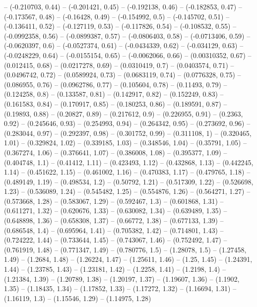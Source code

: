 -- (-0.210703, 0.44)
-- (-0.201421, 0.45)
-- (-0.192138, 0.46)
-- (-0.182853, 0.47)
-- (-0.173567, 0.48)
-- (-0.16428, 0.49)
-- (-0.154992, 0.5)
-- (-0.145702, 0.51)
-- (-0.136411, 0.52)
-- (-0.127119, 0.53)
-- (-0.117826, 0.54)
-- (-0.108532, 0.55)
-- (-0.0992358, 0.56)
-- (-0.0899387, 0.57)
-- (-0.0806403, 0.58)
-- (-0.0713406, 0.59)
-- (-0.0620397, 0.6)
-- (-0.0527374, 0.61)
-- (-0.0434339, 0.62)
-- (-0.034129, 0.63)
-- (-0.0248229, 0.64)
-- (-0.0155154, 0.65)
-- (-0.0062066, 0.66)
-- (0.00310352, 0.67)
-- (0.012415, 0.68)
-- (0.0217278, 0.69)
-- (0.0310419, 0.7)
-- (0.0403574, 0.71)
-- (0.0496742, 0.72)
-- (0.0589924, 0.73)
-- (0.0683119, 0.74)
-- (0.0776328, 0.75)
-- (0.086955, 0.76)
-- (0.0962786, 0.77)
-- (0.105604, 0.78)
-- (0.11493, 0.79)
-- (0.124258, 0.8)
-- (0.133587, 0.81)
-- (0.142917, 0.82)
-- (0.152249, 0.83)
-- (0.161583, 0.84)
-- (0.170917, 0.85)
-- (0.180253, 0.86)
-- (0.189591, 0.87)
-- (0.19893, 0.88)
-- (0.20827, 0.89)
-- (0.217612, 0.9)
-- (0.226955, 0.91)
-- (0.2363, 0.92)
-- (0.245646, 0.93)
-- (0.254993, 0.94)
-- (0.264342, 0.95)
-- (0.273692, 0.96)
-- (0.283044, 0.97)
-- (0.292397, 0.98)
-- (0.301752, 0.99)
-- (0.311108, 1)
-- (0.320465, 1.01)
-- (0.329824, 1.02)
-- (0.339185, 1.03)
-- (0.348546, 1.04)
-- (0.35791, 1.05)
-- (0.367274, 1.06)
-- (0.376641, 1.07)
-- (0.386008, 1.08)
-- (0.395377, 1.09)
-- (0.404748, 1.1)
-- (0.41412, 1.11)
-- (0.423493, 1.12)
-- (0.432868, 1.13)
-- (0.442245, 1.14)
-- (0.451622, 1.15)
-- (0.461002, 1.16)
-- (0.470383, 1.17)
-- (0.479765, 1.18)
-- (0.489149, 1.19)
-- (0.498534, 1.2)
-- (0.50792, 1.21)
-- (0.517309, 1.22)
-- (0.526698, 1.23)
-- (0.536089, 1.24)
-- (0.545482, 1.25)
-- (0.554876, 1.26)
-- (0.564271, 1.27)
-- (0.573668, 1.28)
-- (0.583067, 1.29)
-- (0.592467, 1.3)
-- (0.601868, 1.31)
-- (0.611271, 1.32)
-- (0.620676, 1.33)
-- (0.630082, 1.34)
-- (0.639489, 1.35)
-- (0.648898, 1.36)
-- (0.658308, 1.37)
-- (0.66772, 1.38)
-- (0.677133, 1.39)
-- (0.686548, 1.4)
-- (0.695964, 1.41)
-- (0.705382, 1.42)
-- (0.714801, 1.43)
-- (0.724222, 1.44)
-- (0.733644, 1.45)
-- (0.743067, 1.46)
-- (0.752492, 1.47)
-- (0.761919, 1.48)
-- (0.771347, 1.49)
-- (0.780776, 1.5)
-- (1.28078, 1.5)
-- (1.27458, 1.49)
-- (1.2684, 1.48)
-- (1.26224, 1.47)
-- (1.25611, 1.46)
-- (1.25, 1.45)
-- (1.24391, 1.44)
-- (1.23785, 1.43)
-- (1.23181, 1.42)
-- (1.2258, 1.41)
-- (1.2198, 1.4)
-- (1.21384, 1.39)
-- (1.20789, 1.38)
-- (1.20197, 1.37)
-- (1.19607, 1.36)
-- (1.1902, 1.35)
-- (1.18435, 1.34)
-- (1.17852, 1.33)
-- (1.17272, 1.32)
-- (1.16694, 1.31)
-- (1.16119, 1.3)
-- (1.15546, 1.29)
-- (1.14975, 1.28)
